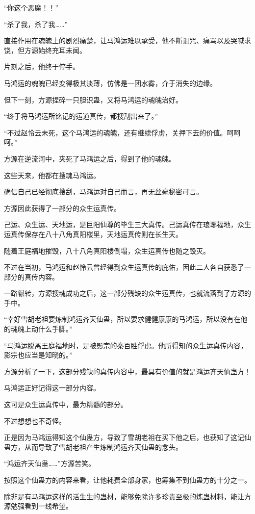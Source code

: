 \begin{this_body}
“你这个恶魔！！”

“杀了我，杀了我……”

直接作用在魂魄上的剧烈痛楚，让马鸿运难以承受，他不断诅咒、痛骂以及哭喊求饶，但方源始终充耳未闻。

片刻之后，他终于停手。

马鸿运的魂魄已经变得极其淡薄，仿佛是一团水雾，介于消失的边缘。

但下一刻，方源捏碎一只胆识蛊，又将马鸿运的魂魄治好。

“终于将马鸿运所铭记的运道真传，都搜刮出来了。”

“不过赵怜云未死，这个马鸿运的魂魄，还有继续俘虏，关押下去的价值。呵呵呵。”

方源在逆流河中，夹死了马鸿运之后，得到了他的魂魄。

这些天来，他都在搜魂马鸿运。

确信自己已经彻底搜刮，马鸿运对自己而言，再无丝毫秘密可言。

方源因此获得了一部分的众生运真传。

己运、众生运、天地运，是巨阳仙尊的毕生三大真传。己运真传在琅琊福地，众生运真传保存在八十八角真阳楼里，天地运真传则在长生天。

随着王庭福地摧毁，八十八角真阳楼倒塌，众生运真传也随之毁灭。

不过在当初，马鸿运和赵怜云曾经得到众生运真传的庇佑，因此二人各自获悉了一部分的真传内容。

一路辗转，方源搜魂成功之后，这一部分残缺的众生运真传，也就流落到了方源的手中。

“幸好雪胡老祖要炼制鸿运齐天仙蛊，所以要求健健康康的马鸿运，所以没有在他的魂魄上动什么手脚。”

“马鸿运脱离王庭福地时，是被影宗的秦百胜俘虏。他所得知的众生运真传内容，影宗也应当是知晓的。”

方源分析了一下，这部分残缺的真传内容中，最具有价值的就是鸿运齐天仙蛊方！

马鸿运正好记得这一部分内容。

这可是众生运真传中，最为精髓的部分。

不过想想也不奇怪。

正是因为马鸿运得知这个仙蛊方，导致了雪胡老祖在买下他之后，也获知了这记仙蛊方，从而导致了雪胡老祖产生炼制鸿运齐天仙蛊的念头。

“鸿运齐天仙蛊……”方源苦笑。

按照这个仙蛊方的内容来看，让他耗费全部身家，也筹集不到仙蛊方的十分之一。

除非是有马鸿运这样的活生生的蛊材，能够免除许多珍贵至极的炼蛊材料，能让方源勉强看到一线希望。


\end{this_body}
